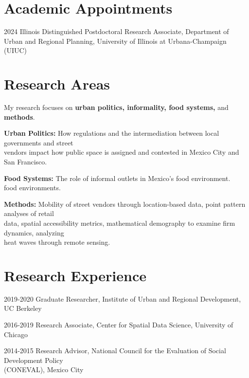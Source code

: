 \documentclass[12pt,letterpaper]{report}
\newcommand{\listitemspace}{0.25em}
\renewenvironment{itemize}
{\begin{list}{}{\setlength{\leftmargin}{0em}
                \setlength{\parskip}{0em}
                \setlength{\itemsep}{\listitemspace}
                \setlength{\parsep}{\listitemspace}}}
{\end{list}}
\begin{document}
    \section*{Academic Appointments}
    \begin{tablist}
       \item[2024] \quad{} Illinois Distinguished Postdoctoral Research Associate, Department of Urban and Regional Planning, University of Illinois at Urbana-Champaign (UIUC)
    \end{tablist}


    
    \section*{Research Areas}
    \begin{itemize}
\item My research focuses on \textbf{urban politics, informality, food systems,} and \textbf{methods}.

\subitem \textbf{Urban Politics:} How regulations and the intermediation between local governments and street \\
\hspace{1.5em} vendors impact how public space is assigned and contested in Mexico City and San Francisco.

\subitem \textbf{Food Systems:} The role of informal outlets in Mexico's food environment. \\
\hspace{1.5em} food environments.

\subitem \textbf{Methods:}  Mobility of street vendors through location-based data, point pattern analyses of retail\\
\hspace{1.5em} data, spatial accessibility metrics,  mathematical demography to examine firm dynamics, analyzing \\
\hspace{1.5em} heat waves through remote sensing. 
    \end{itemize}
    
    \section*{Research Experience}
    \begin{tablist}
        \item[2019‐2020] \quad{}Graduate Researcher, Institute of Urban and Regional Development, UC Berkeley
        \item[2016‐2019] \quad{}Research Associate, Center for Spatial Data Science, University of Chicago
        \item[2014‐2015] \quad{}Research Advisor, National Council for the Evaluation of Social Development Policy \\
        \hspace{1em}(CONEVAL), Mexico City
    \end{tablist}
\end{document}
